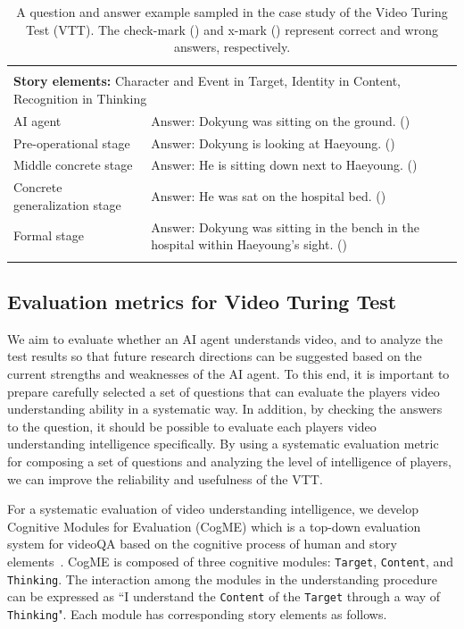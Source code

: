\documentclass[letterpaper]{article} %
\newcommand{\cmark}{\ding{51}}
\newcommand{\xmark}{\ding{55}}
\begin{document}
\begin{table}[]
\centering
\begin{tabular}{ll}
\Xhline{2\arrayrulewidth}
\multicolumn{2}{l}{\textbf{Question:} What did Dokyung do in this scene?} \\
\multicolumn{2}{l}{\textbf{Story elements:} Character and Event in Target, Identity in Content, Recognition in Thinking} \\
\hline
AI agent & Answer: Dokyung was sitting on the ground. (\xmark)\\
Pre-operational stage & Answer: Dokyung is looking at Haeyoung. (\xmark)\\
Middle concrete stage & Answer: He is sitting down next to Haeyoung. (\cmark)\\
Concrete generalization stage & Answer: He was sat on the hospital bed. (\cmark)\\
Formal stage & Answer: Dokyung was sitting in the bench in the hospital within Haeyoung's sight. (\cmark)\\
\Xhline{2\arrayrulewidth}
\end{tabular}
\caption{A question and answer example sampled in the case study of the Video Turing Test (VTT). The check-mark (\cmark) and x-mark (\xmark) represent correct and wrong answers, respectively.}
\label{table:qual}
\end{table}

\subsection{Evaluation metrics for Video Turing Test}
We aim to evaluate whether an AI agent understands video, and to analyze the test results so that future research directions can be suggested based on the current strengths and weaknesses of the AI agent.
To this end, it is important to prepare carefully selected a set of questions that can evaluate the players video understanding ability in a systematic way.
In addition, by checking the answers to the question, it should be possible to evaluate each players video understanding intelligence specifically.
By using a systematic evaluation metric for composing a set of questions and analyzing the level of intelligence of players, we can improve the reliability and usefulness of the VTT.

For a systematic evaluation of video understanding intelligence, we develop Cognitive Modules for Evaluation (CogME) which is a top-down evaluation system for videoQA based on the cognitive process of human and story elements~\cite{shin2021cogme}.
CogME is composed of three cognitive modules: \texttt{Target}, \texttt{Content}, and \texttt{Thinking}. The interaction among the modules in the understanding procedure can be expressed as ``I understand the \texttt{Content} of the \texttt{Target} through a way of \texttt{Thinking}". Each module has corresponding story elements as follows.
\end{document}
